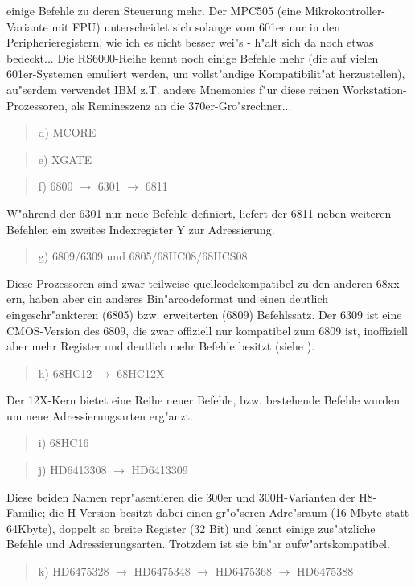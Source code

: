 \documentclass[12pt,a4paper,twoside]{report}
\begin{document}
einige Befehle zu deren Steuerung mehr.  Der MPC505 (eine Mikrokontroller-Variante mit FPU)
unterscheidet sich solange vom 601er nur in den Peripherieregistern,
wie ich es nicht besser wei"s - \cite{Mot505} h"alt sich da noch etwas bedeckt...
Die RS6000-Reihe kennt noch einige Befehle mehr (die auf vielen
601er-Systemen emuliert werden, um vollst"andige Kompatibilit"at
herzustellen), au"serdem verwendet IBM z.T. andere Mnemonics f"ur
diese reinen Workstation-Prozessoren, als Remineszenz an die
370er-Gro"srechner...
\begin{quote}
d) MCORE
\end{quote}
\begin{quote}
e) XGATE
\end{quote}
\begin{quote}
f) 6800 $\rightarrow$ 6301 $\rightarrow$ 6811
\end{quote}
W"ahrend der 6301 nur neue Befehle definiert, liefert der 6811 neben
weiteren Befehlen ein zweites Indexregister Y zur Adressierung.
\begin{quote}
g) 6809/6309 und 6805/68HC08/68HCS08
\end{quote}
Diese Prozessoren sind zwar teilweise quellcodekompatibel zu den
anderen 68xx-ern, haben aber ein anderes Bin"arcodeformat und einen
deutlich eingeschr"ankteren (6805) bzw. erweiterten (6809) Befehlssatz.
Der 6309 ist eine CMOS-Version des 6809, die zwar offiziell
nur kompatibel zum 6809 ist, inoffiziell aber mehr Register und
deutlich mehr Befehle besitzt (siehe \cite{Kaku}).
\begin{quote}
h) 68HC12 $\longrightarrow$ 68HC12X
\end{quote}
Der 12X-Kern bietet eine Reihe neuer Befehle, bzw. bestehende Befehle
wurden um neue Adressierungsarten erg"anzt.
\begin{quote}
i) 68HC16
\end{quote}
\begin{quote}
j) HD6413308 $\longrightarrow$ HD6413309
\end{quote}
Diese beiden Namen repr"asentieren die 300er und 300H-Varianten der
H8-Familie; die H-Version besitzt dabei einen gr"o"seren Adre"sraum
(16 Mbyte statt 64Kbyte), doppelt so breite Register (32 Bit) und
kennt einige zus"atzliche Befehle und Adressierungsarten.  Trotzdem
ist sie bin"ar aufw"artskompatibel.
\begin{quote}
k) HD6475328 $\longrightarrow$ HD6475348 $\longrightarrow$
   HD6475368 $\longrightarrow$ HD6475388
\end{quote}
\end{document}
